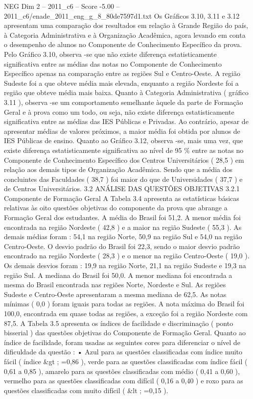 \begin{textsample}{NEG Dim 2 – 2011\_c6 – Score -5.00 – 2011\_c6/enade\_2011\_eng\_g\_8\_80de7597d1.txt}
Os Gráficos 3.10, 3.11 e 3.12 apresentam uma comparação dos resultados em relação à Grande Região do país, à Categoria Administrativa e à Organização Acadêmica, agora levando em conta o desempenho de alunos no Componente de Conhecimento Específico da prova.
Pelo Gráfico 3.10, observa -se que não existe diferença estatisticamente significativa entre as médias das notas no Componente de Conhecimento Específico apenas na comparação entre as regiões Sul e Centro-Oeste.
A região Sudeste foi a que obteve média mais elevada, enquanto a região Nordeste foi a região que obteve média mais baixa.
Quanto à Categoria Administrativa ( gráfico 3.11 ), observa -se um comportamento semelhante àquele da parte de Formação Geral e à prova como um todo, ou seja, não existe diferença estatisticamente significativa entre as médias das IES Públicas e Privadas.
Ao contrário, apesar de apresentar médias de valores próximos, a maior média foi obtida por alunos de IES Públicas de ensino.
Quanto ao Gráfico 3.12, observa -se, mais uma vez, que existe diferença estatisticamente significativa ao nível de 95 \% entre as notas no Componente de Conhecimento Específico dos Centros Universitários ( 28,5 ) em relação aos demais tipos de Organização Acadêmica.
Sendo que a média dos concluintes das Faculdades ( 38,7 ) foi maior do que de Universidades ( 37,7 ) e de Centros Universitários. 3.2 ANÁLISE DAS QUESTÕES OBJETIVAS 3.2.1 Componente de Formação Geral A Tabela 3.4 apresenta as estatísticas básicas relativas às oito questões objetivas do componente da prova que abrange a Formação Geral dos estudantes.
A média do Brasil foi 51,2.
A menor média foi encontrada na região Nordeste ( 42,8 ) e a maior na região Sudeste ( 55,3 ).
As demais médias foram : 54,1 na região Norte, 50,9 na região Sul e 54,0 na região Centro-Oeste.
O desvio padrão do Brasil foi 22,3, sendo o maior desvio padrão encontrado na região Nordeste ( 28,3 ) e o menor na região Centro-Oeste ( 19,0 ).
Os demais desvios foram : 19,9 na região Norte, 21,1 na região Sudeste e 19,3 na região Sul.
A mediana do Brasil foi 50,0.
A menor mediana foi encontrada a mesma do Brasil encontrada nas regiões Norte, Nordeste e Sul.
As regiões Sudeste e Centro-Oeste apresentaram a mesma mediana de 62,5.
As notas mínimas ( 0,0 ) foram iguais para todas as regiões.
A nota máxima do Brasil foi 100,0, encontrada em quase todas as regiões, a exceção foi a região Nordeste com 87,5.
A Tabela 3.5 apresenta os índices de facilidade e discriminação ( ponto bisserial ) das questões objetivas do Componente de Formação Geral.
Quanto ao índice de facilidade, foram usadas as seguintes cores para diferenciar o nível de dificuldade da questão : • Azul para as questões classificadas com índice muito fácil ( índice \&gt ; =0,86 ), verde para as questões classificadas com índice fácil ( 0,61 a 0,85 ), amarelo para as questões classificadas com médio ( 0,41 a 0,60 ), vermelho para as questões classificadas com difícil ( 0,16 a 0,40 ) e roxo para as questões classificadas com muito difícil ( \&lt ; =0,15 ).

\end{textsample}
